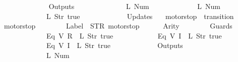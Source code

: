 \begin{isabellebody}
\ \ \ \ \ \ {\isacharbrackright}{\isacharcomma}\isanewline
\ \ \ \ \ \ Outputs\ {\isacharequal}\ {\isacharbrackleft}\isanewline
\ \ \ \ \ \ \ \ \ \ \ \ {\isacharparenleft}L\ {\isacharparenleft}Num\ {}{\isacharparenright}{\isacharparenright}{\isacharcomma}\isanewline
\ \ \ \ \ \ \ \ \ \ \ \ {\isacharparenleft}L\ {\isacharparenleft}Num\ {}{\isacharparenright}{\isacharparenright}{\isacharcomma}\isanewline
\ \ \ \ \ \ \ \ \ \ \ \ {\isacharparenleft}L\ {\isacharparenleft}Str\ {\isacharprime}{\isacharprime}true{\isacharprime}{\isacharprime}{\isacharparenright}{\isacharparenright}\isanewline
\ \ \ \ \ \ {\isacharbrackright}{\isacharcomma}\isanewline
\ \ \ \ \ \ Updates\ {\isacharequal}\ {\isacharbrackleft}{\isacharbrackright}\isanewline
{\isasymrparr}{\isachardoublequoteclose}\isanewline
\isanewline
{}\isamarkupfalse%
\ {\isachardoublequoteopen}motorstop{}{\isachardoublequoteclose}\ {\isacharcolon}{\isacharcolon}\ {\isachardoublequoteopen}transition{\isachardoublequoteclose}\ \isanewline
{\isachardoublequoteopen}motorstop{}\ {\isasymequiv}\ {\isasymlparr}\isanewline
\ \ \ \ \ \ Label\ {\isacharequal}\ STR\ {\isacharprime}{\isacharprime}motorstop{\isacharprime}{\isacharprime}{\isacharcomma}\isanewline
\ \ \ \ \ \ Arity\ {\isacharequal}\ {}{\isacharcomma}\isanewline
\ \ \ \ \ \ Guards\ {\isacharequal}\ {\isacharbrackleft}\isanewline
\ \ \ \ \ \ \ \ \ \ \ \ {\isacharparenleft}Eq\ {\isacharparenleft}V\ {\isacharparenleft}R\ {}{\isacharparenright}{\isacharparenright}\ {\isacharparenleft}L\ {\isacharparenleft}Str\ {\isacharprime}{\isacharprime}true{\isacharprime}{\isacharprime}{\isacharparenright}{\isacharparenright}{\isacharparenright}{\isacharcomma}\isanewline
\ \ \ \ \ \ \ \ \ \ \ \ {\isacharparenleft}Eq\ {\isacharparenleft}V\ {\isacharparenleft}I\ {}{\isacharparenright}{\isacharparenright}\ {\isacharparenleft}L\ {\isacharparenleft}Str\ {\isacharprime}{\isacharprime}true{\isacharprime}{\isacharprime}{\isacharparenright}{\isacharparenright}{\isacharparenright}{\isacharcomma}\isanewline
\ \ \ \ \ \ \ \ \ \ \ \ {\isacharparenleft}Eq\ {\isacharparenleft}V\ {\isacharparenleft}I\ {}{\isacharparenright}{\isacharparenright}\ {\isacharparenleft}L\ {\isacharparenleft}Str\ {\isacharprime}{\isacharprime}true{\isacharprime}{\isacharprime}{\isacharparenright}{\isacharparenright}{\isacharparenright}\isanewline
\ \ \ \ \ \ {\isacharbrackright}{\isacharcomma}\isanewline
\ \ \ \ \ \ Outputs\ {\isacharequal}\ {\isacharbrackleft}\isanewline
\ \ \ \ \ \ \ \ \ \ \ \ {\isacharparenleft}L\ {\isacharparenleft}Num\ {}{\isacharparenright}{\isacharparenright}{\isacharcomma}\isanewline

\end{isabellebody}
